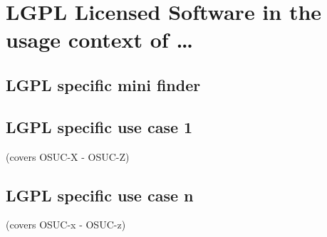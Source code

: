 %
%
%
%
%



\section{LGPL Licensed Software in the usage context of \ldots}
\label{OSUC-01-LGPL} \label{OSUC-03-LGPL} 
\label{OSUC-06-LGPL} \label{OSUC-09-LGPL}

\label{OSUC-02-LGPL} \label{OSUC-04-LGPL} \label{OSUC-05-LGPL}
\label{OSUC-07-LGPL} \label{OSUC-08-LGPL} \label{OSUC-10-LGPL}

\subsection{LGPL specific mini finder}

\subsection{LGPL specific use case 1}
(covers OSUC-X - OSUC-Z)

\subsection{LGPL specific use case n}
(covers OSUC-x - OSUC-z)


%
